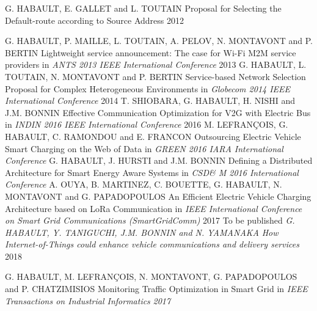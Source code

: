 \documentclass[11pt, a4paper]{awesome-cv}
\begin{document}


\begin{cvhonors}
  \cvpublication
  	{}
    {G. HABAULT, E. GALLET and L. TOUTAIN}
    {Proposal for Selecting the Default-route according to Source Address}
    {}
    {2012}
\end{cvhonors}

\begin{cvhonors}
  \cvpublication
  	{}
    {G. HABAULT, P. MAILLE, L. TOUTAIN, A. PELOV, N. MONTAVONT and P. BERTIN}
    {Lightweight service announcement: The
case for Wi-Fi M2M service providers}
    {in \textit{ANTS 2013 IEEE International Conference}}
    {2013}
  \cvpublication
  	{}
    {G. HABAULT, L. TOUTAIN, N. MONTAVONT and P. BERTIN}
    {Service-based Network Selection Proposal for Complex
Heterogeneous Environments}
    {in \textit{Globecom 2014 IEEE International Conference}}
    {2014}
  \cvpublication
  	{}
    {T. SHIOBARA, G. HABAULT, H. NISHI and J.M. BONNIN}
    {Effective Communication Optimization for V2G with Electric Bus}
    {in \textit{INDIN 2016 IEEE International Conference}}
    {2016}
  \cvpublication
  	{}
    {M. LEFRANÇOIS, G. HABAULT, C. RAMONDOU and E. FRANCON}
    {Outsourcing Electric Vehicle Smart Charging on the Web of
Data}
    {in \textit{GREEN 2016 IARA International Conference}}
    {}     
  \cvpublication
  	{}
    {G. HABAULT, J. HURSTI and J.M. BONNIN}
    {Defining a Distributed Architecture for Smart Energy Aware Systems}
    {in \textit{CSD\& M
2016 International Conference}}
    {}
  \cvpublication
  	{}
    {A. OUYA, B. MARTINEZ, C. BOUETTE, G. HABAULT, N. MONTAVONT and G. PAPADOPOULOS}
    {An Efficient Electric Vehicle Charging Architecture based on LoRa Communication}
    {in \textit{IEEE International Conference on Smart Grid Communications (SmartGridComm)}}
    {2017}
  \cvpublication
  	{To be published}
    {\textit{G. HABAULT, Y. TANIGUCHI, J.M. BONNIN and N. YAMANAKA}}
    {\textit{How Internet-of-Things could enhance vehicle communications and delivery services}}
    {}
    {2018}
\end{cvhonors}
    
\begin{cvhonors}
  \cvpublication
  	{}
    {G. HABAULT, M. LEFRANÇOIS, N. MONTAVONT, G. PAPADOPOULOS and P. CHATZIMISIOS}
    {Monitoring Traffic Optimization in Smart Grid}
    {in \textit{IEEE Transactions on Industrial Informatics}}
    {\textit{2017}}   
\end{cvhonors}
\end{document}
